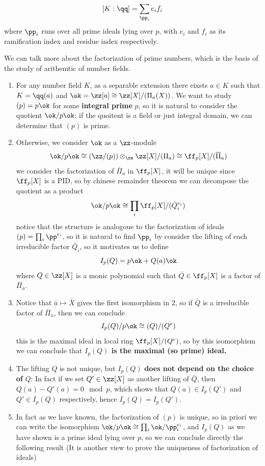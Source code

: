 \begin{colorcorollary}
    \[[K:\qq] = \sum_{\pp_i} e_if_i \]
    where \(\pp_i\) runs over all prime ideals lying over \(p\), with \(e_i\) and \(f_i\) as its ramification index and residue index respectively.
\end{colorcorollary}

We can talk more about the factorization of prime numbers, which is the basis of the study of arithemtic of number fields.

\begin{enumerate}
    \item For any number field \(K\), as a separable extension there eixsts \(a \in K\) such that \(K = \qq(a)\) and \(\ok = \zz[a] \cong \zz[X]/(\Pi_a(X))\). We want to study \((p) = p\ok\) for some \textbf{integral prime} \(p\), so it is natural to consider the quotient \(\ok/p\ok\): if the quoitent is a field or just integral domain, we can determine that \((p)\) is prime.

    \item Otherwise, we consider \(\ok\) as a \(\zz\)-module
    \[\ok/p\ok \cong (\zz/(p)) \otimes_{\zz} \zz[X]/(\Pi_a) \cong \ff_p[X]/(\overline{\Pi}_a)\]
    we consider the factorization of \(\bar{\Pi}_a\) in \(\ff_p[X]\), it will be unique since \(\ff_p[X]\) is a PID, so by chinese remainder theorem we can decompose the quotient as a product 
    \[\ok/p\ok \cong \prod_{i}\ff_p[X]/(\bar{Q}_i^{e_{i}})\]
    notice that the structure is analogoue to the factorization of ideals \((p) = \prod_i \pp^{e_i}\), so it is natural to find \(\pp_i\) by consider the lifting of each irreducible factor \(\bar{Q}_i\), so it motivates us to define
    \[I_p(Q) = p\ok + Q(a)\ok\]
    where \(Q \in \zz[X]\) is a monic polynomial such that \(\bar{Q} \in \ff_p[X]\) is a factor of \(\bar{\Pi}_a\).

    \item Notice that \(\bar{a} \mapsto \bar{X}\) gives the first isomorphism in 2, so if \(\bar{Q}\) is a irreducible factor of \(\bar{\Pi}_a\), then  we can conclude  \[I_p(Q)/p\ok \cong (Q)/(Q^{e})\] this is the maximal ideal in local ring \(\ff_p[X]/(Q^{e})\), so by this isomorphism we can conclude that \textbf{\(I_p(Q)\) is the maximal (so prime) ideal.}
    
    \item The lifting \(Q\) is not unique, but \(I_p(Q)\) \textbf{does not depend on the choice of} \(Q\): In fact if we set \(Q' \in \zz[X]\) as another lifting of \(\bar{Q}\), then \(Q(a) - Q'(a) = 0 \mod p\), which shows that \(Q(a) \in I_p(Q')\) and \(Q' \in I_p(Q)\) respectively, hence \(I_p(Q) = I_p(Q')\).
    
    \item In fact as we have known, the factorization of \((p)\) is unique, so in priori we can write the isomorphism \(\ok/p\ok \cong \prod_{i} \ok/\pp_i^{e_i}\), and \(I_p(Q)\) as we have shown is a prime ideal lying over \(p\), so we can conclude directly the following result (It is another view to prove the uniqueness of factorization of ideals)
\end{enumerate}


